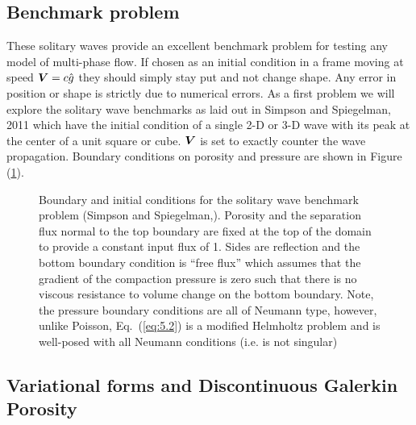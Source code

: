\subsection{Benchmark problem}
\label{sec:benchmark-problem}

These solitary waves provide an excellent benchmark problem for
testing any model of multi-phase flow.  If chosen as an initial
condition in a frame moving at speed ${\mbox{\boldmath$V$}} = c\hat{g}$ they should
simply stay put and not change shape.  Any error in position or shape
is strictly due to numerical errors.  As a first problem we will
explore the solitary wave benchmarks as laid out in Simpson and
Spiegelman, 2011 \cite{simpson_solitary_2011} which have the initial
condition of  a single 2-D
or 3-D wave with its peak at the center of a unit square or cube.
${\mbox{\boldmath$V$}}$ is set to exactly counter the wave propagation.  Boundary
conditions on porosity and pressure are shown in Figure (\ref{fig:solitarywavebcs}). 

\begin{figure}[htbp!]
  \centering
  \def\svgwidth{.8\textwidth}
  
  \caption{Boundary and initial conditions for the solitary wave
    benchmark problem (Simpson and
    Spiegelman,\cite{simpson_solitary_2011}). Porosity and the
    separation flux normal to the top boundary are fixed at the top of
    the domain to provide  a constant input flux of 1.
  Sides are reflection and the bottom boundary condition is ``free
  flux'' which assumes that the gradient of the compaction pressure is
zero such that there is no viscous resistance to volume change on the
bottom boundary. Note, the pressure boundary conditions are all of
Neumann type,  however, unlike Poisson,  Eq.\ (\ref{eq:5.2}) is a
modified Helmholtz problem and is well-posed with all Neumann
conditions (i.e. is not singular)}
  \label{fig:solitarywavebcs}
\end{figure}


\subsection{Variational forms and Discontinuous Galerkin Porosity}
\label{sec:variational-forms}

